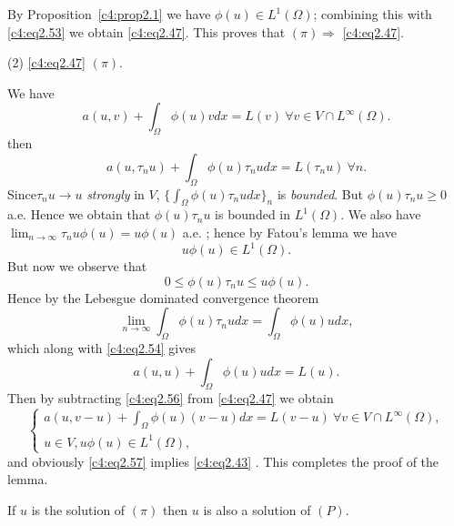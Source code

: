 By Proposition~\ref{c4:prop2.1} we have $\phi (u) \in L^1 (\Omega)$;
combining this with \eqref{c4:eq2.53} we obtain
\eqref{c4:eq2.47}. This proves that $(\pi) \Rightarrow$
\eqref{c4:eq2.47}. 
  
(2) \eqref{c4:eq2.47}  $(\pi)$.

We have
  $$
  a (u, v) + \int_\Omega \phi (u) v dx = L (v) \ \forall v \in V \cap
  L^\infty (\Omega). 
  $$
 then
\begin{equation}
  a (u, \tau_n u) + \int_\Omega \phi (u) \tau_n u dx = L (\tau_n u)
  \ \forall n.\tag{2.54}\label{c4:eq2.54} 
\end{equation}
Since\pageoriginale  $\tau_n u \to u$ \textit{strongly} in $V$, $\{ \int_\Omega \phi (u) \tau_n u dx\}_n$ is \textit{bounded}. But $\phi (u) \tau_n u \geq 0$ a.e. Hence we obtain that $\phi (u) \tau_n u$ is bounded in $L^1 (\Omega)$. We also have $\lim_{n \to \infty} \tau_n u \phi (u) = u \phi (u)$ a.e. ; hence by Fatou's lemma we have
\begin{equation}
u \phi (u) \in L^1 (\Omega). \tag{2.55}\label{c4:eq2.55}
\end{equation}  
But now we observe that
  $$
0 \leq \phi (u) \tau_n u \leq u \phi (u).
$$
Hence by the Lebesgue dominated convergence theorem
$$
\lim_{n \to \infty} \int_\Omega \phi (u) \tau_n u dx = \int_\Omega \phi (u) u dx,
  $$ 
  which along with \eqref{c4:eq2.54} gives
  \begin{equation}
a (u, u) + \int_{\Omega} \phi (u)u dx = L (u). \tag{2.56}\label{c4:eq2.56}
  \end{equation}  
  Then by subtracting \eqref{c4:eq2.56} from \eqref{c4:eq2.47} we obtain
  \begin{equation}
\begin{cases}
a (u, v-u) + \int_\Omega \phi (u) (v - u) dx = L (v-u) \ \forall v \in V \cap L^\infty (\Omega), \\ 
u \in V, u \phi (u) \in L^1 (\Omega), \tag{2.57}\label{c4:eq2.57}
\end{cases}
  \end{equation}  
  and obviously \eqref{c4:eq2.57} implies \eqref{c4:eq2.43} . This completes the proof of the lemma. 

\begin{corollary}\label{c4:cor2.2} %
If $u$ is the solution of $(\pi)$ then $u$ is also a solution of $(P)$.
  \end{corollary}  


